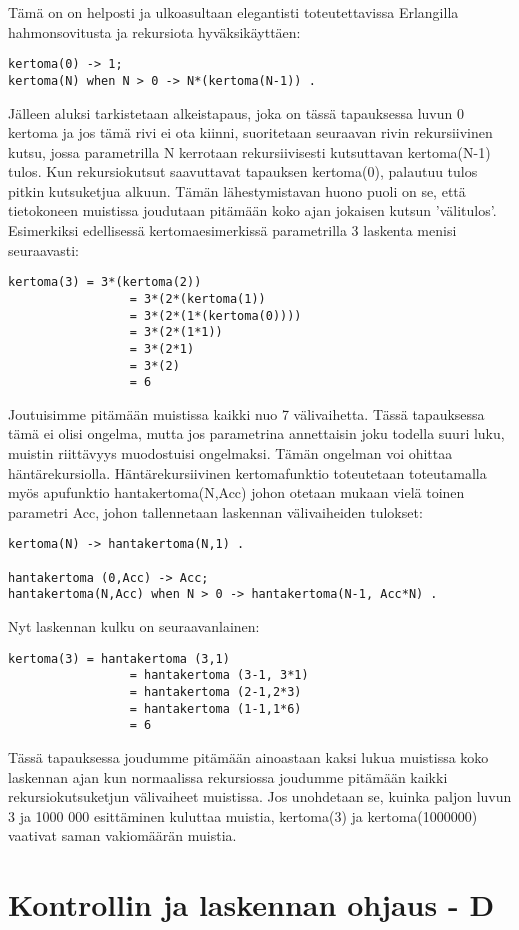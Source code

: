 \documentclass[11pt,oneside,a4paper]{article}
\begin{document}
Tämä on on helposti ja ulkoasultaan elegantisti toteutettavissa Erlangilla hahmonsovitusta ja rekursiota hyväksikäyttäen:
\begin{verbatim}
kertoma(0) -> 1;
kertoma(N) when N > 0 -> N*(kertoma(N-1)) .
\end{verbatim}
Jälleen aluksi tarkistetaan alkeistapaus, joka on tässä tapauksessa luvun 0 kertoma ja jos tämä rivi ei ota kiinni, suoritetaan seuraavan rivin rekursiivinen kutsu, jossa parametrilla N kerrotaan rekursiivisesti kutsuttavan kertoma(N-1) tulos.
Kun rekursiokutsut saavuttavat tapauksen kertoma(0), palautuu tulos pitkin kutsuketjua alkuun. Tämän lähestymistavan huono puoli on se, että tietokoneen muistissa joudutaan pitämään koko ajan jokaisen kutsun 'välitulos'. Esimerkiksi edellisessä 
kertomaesimerkissä parametrilla 3 laskenta menisi seuraavasti:
\begin{verbatim}
kertoma(3) = 3*(kertoma(2))
                 = 3*(2*(kertoma(1))
                 = 3*(2*(1*(kertoma(0))))
                 = 3*(2*(1*1))
                 = 3*(2*1)
                 = 3*(2)
                 = 6
\end{verbatim}
Joutuisimme pitämään muistissa kaikki nuo 7 välivaihetta. Tässä tapauksessa tämä ei olisi ongelma, mutta jos parametrina annettaisin joku todella suuri luku, muistin riittävyys muodostuisi ongelmaksi. 
Tämän ongelman voi ohittaa häntärekursiolla. Häntärekursiivinen kertomafunktio toteutetaan toteutamalla myös apufunktio hantakertoma(N,Acc) johon otetaan mukaan vielä toinen parametri Acc, johon tallennetaan laskennan 
välivaiheiden tulokset:
\begin{verbatim}
kertoma(N) -> hantakertoma(N,1) .

hantakertoma (0,Acc) -> Acc;
hantakertoma(N,Acc) when N > 0 -> hantakertoma(N-1, Acc*N) .
\end{verbatim}

Nyt laskennan kulku on seuraavanlainen: 
\begin{verbatim}
kertoma(3) = hantakertoma (3,1)
                 = hantakertoma (3-1, 3*1)		
                 = hantakertoma (2-1,2*3)
                 = hantakertoma (1-1,1*6)
                 = 6
\end{verbatim}
Tässä tapauksessa joudumme pitämään ainoastaan kaksi lukua muistissa koko laskennan ajan kun normaalissa rekursiossa joudumme pitämään kaikki rekursiokutsuketjun välivaiheet muistissa. Jos unohdetaan se, kuinka paljon luvun 3 ja 1000 000 esittäminen kuluttaa muistia, kertoma(3) ja kertoma(1000000) vaativat saman vakiomäärän muistia. 

\section{Kontrollin ja laskennan ohjaus - D}
\end{document}
